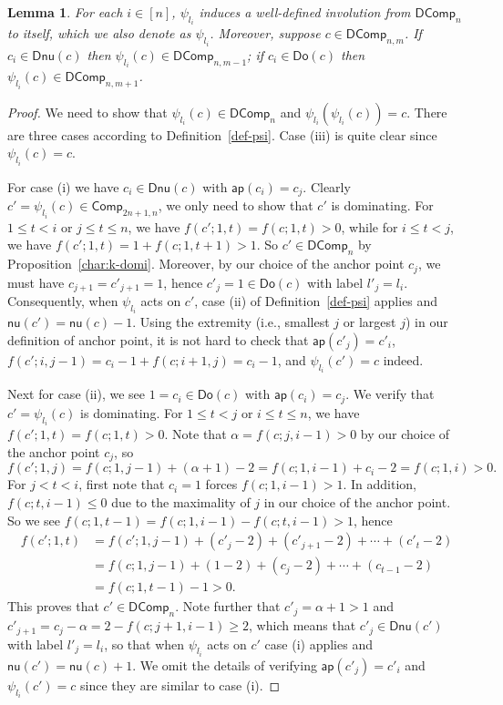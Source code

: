 \documentclass[reqno]{amsart}
\numberwithin{equation}{section}
\newtheorem{lemma}[theorem]{Lemma}
\theoremstyle{definition}
\theoremstyle{named}
\def\Comp{\mathsf{Comp}}
\def\DComp{\mathsf{DComp}}
\def\nonu{\mathsf{nu}}
\def\Dnu{\mathsf{Dnu}}
\def\Do{\mathsf{Do}}
\def\ap{\mathsf{ap}}
\begin{document}
\begin{lemma}\label{lem:psi-involution}
For each $i\in[n]$, $\psi_{l_i}$ induces a well-defined involution from $\DComp_n$ to itself, which we also denote as $\psi_{l_i}$. Moreover, suppose $c\in\DComp_{n,m}$. If $c_i\in\Dnu(c)$ then $\psi_{l_i}(c)\in\DComp_{n,m-1}$; if $c_i\in\Do(c)$ then $\psi_{l_i}(c)\in\DComp_{n,m+1}$.
\end{lemma}
\begin{proof}
We need to show that $\psi_{l_i}(c)\in\DComp_n$ and $\psi_{l_i}(\psi_{l_i}(c))=c$. There are three cases according to Definition~\ref{def-psi}. Case (iii) is quite clear since $\psi_{l_i}(c)=c$. 

For case (i) we have $c_i\in\Dnu(c)$ with $\ap(c_i)=c_j$. Clearly $c'=\psi_{l_i}(c)\in\Comp_{2n+1,n}$, we only need to show that $c'$ is dominating. For $1\le t< i$ or $j\le t\le n$, we have $f(c';1,t)=f(c;1,t)>0$, while for $i\le t<j$, we have $f(c';1,t)=1+f(c;1,t+1)>1$. So $c'\in\DComp_n$ by Proposition~\ref{char:k-domi}. Moreover, by our choice of the anchor point $c_j$, we must have $c_{j+1}=c'_{j+1}=1$, hence $c'_j=1\in\Do(c)$ with label $l'_j=l_i$. Consequently, when $\psi_{l_i}$ acts on $c'$, case (ii) of Definition~\ref{def-psi} applies and $\nonu(c')=\nonu(c)-1$. Using the extremity (i.e., smallest $j$ or largest $j$) in our definition of anchor point, it is not hard to check that $\ap(c'_j)=c'_i$, $f(c';i,j-1)=c_i-1+f(c;i+1,j)=c_i-1$, and $\psi_{l_i}(c')=c$ indeed.

Next for case (ii), we see $1=c_i\in\Do(c)$ with $\ap(c_i)=c_j$. We verify that $c'=\psi_{l_i}(c)$ is dominating. For $1\le t<j$ or $i\le t\le n$, we have $f(c';1,t)=f(c;1,t)>0$. Note that $\alpha=f(c;j,i-1)>0$ by our choice of the anchor point $c_j$, so 
$$f(c';1,j)=f(c;1,j-1)+(\alpha+1)-2=f(c;1,i-1)+c_i-2=f(c;1,i)>0.$$
For $j<t<i$, first note that $c_i=1$ forces $f(c;1,i-1)>1$. In addition, $f(c;t,i-1)\le 0$ due to the maximality of $j$ in our choice of the anchor point. So we see $f(c;1,t-1)=f(c;1,i-1)-f(c;t,i-1)>1$, hence 
\begin{align*}
f(c';1,t) &=f(c';1,j-1)+(c'_j-2)+(c'_{j+1}-2)+\cdots+(c'_t-2)\\
&=f(c;1,j-1)+(1-2)+(c_j-2)+\cdots+(c_{t-1}-2)\\
&=f(c;1,t-1)-1>0.
\end{align*}
This proves that $c'\in\DComp_n$. Note further that $c'_j=\alpha+1>1$ and $c'_{j+1}=c_j-\alpha=2-f(c;j+1,i-1)\ge 2$, which means that $c'_j\in\Dnu(c')$ with label $l'_j=l_i$, so that when $\psi_{l_i}$ acts on $c'$ case (i) applies and $\nonu(c')=\nonu(c)+1$. We omit the details of verifying $\ap(c'_j)=c'_i$ and $\psi_{l_i}(c')=c$ since they are similar to case (i).
\end{proof}
\end{document}
